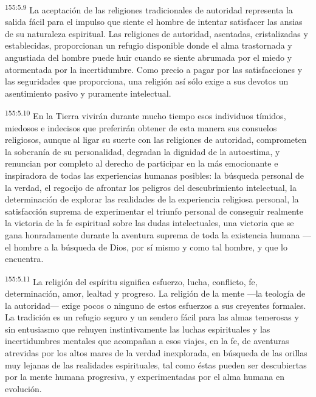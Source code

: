\par 
\textsuperscript{155:5.9} La aceptación de las religiones tradicionales de autoridad representa la salida fácil para el impulso que siente el hombre de intentar satisfacer las ansias de su naturaleza espiritual. Las religiones de autoridad, asentadas, cristalizadas y establecidas, proporcionan un refugio disponible donde el alma trastornada y angustiada del hombre puede huir cuando se siente abrumada por el miedo y atormentada por la incertidumbre. Como precio a pagar por las satisfacciones y las seguridades que proporciona, una religión así sólo exige a sus devotos un asentimiento pasivo y puramente intelectual.

\par 
\textsuperscript{155:5.10} En la Tierra vivirán durante mucho tiempo esos individuos tímidos, miedosos e indecisos que preferirán obtener de esta manera sus consuelos religiosos, aunque al ligar su suerte con las religiones de autoridad, comprometen la soberanía de su personalidad, degradan la dignidad de la autoestima, y renuncian por completo al derecho de participar en la más emocionante e inspiradora de todas las experiencias humanas posibles: la búsqueda personal de la verdad, el regocijo de afrontar los peligros del descubrimiento intelectual, la determinación de explorar las realidades de la experiencia religiosa personal, la satisfacción suprema de experimentar el triunfo personal de conseguir realmente la victoria de la fe espiritual sobre las dudas intelectuales, una victoria que se gana honradamente durante la aventura suprema de toda la existencia humana ---el hombre a la búsqueda de Dios, por sí mismo y como tal hombre, y que lo encuentra.

\par 
\textsuperscript{155:5.11} La religión del espíritu significa esfuerzo, lucha, conflicto, fe, determinación, amor, lealtad y progreso. La religión de la mente ---la teología de la autoridad--- exige pocos o ninguno de estos esfuerzos a sus creyentes formales. La tradición es un refugio seguro y un sendero fácil para las almas temerosas y sin entusiasmo que rehuyen instintivamente las luchas espirituales y las incertidumbres mentales que acompañan a esos viajes, en la fe, de aventuras atrevidas por los altos mares de la verdad inexplorada, en búsqueda de las orillas muy lejanas de las realidades espirituales, tal como éstas pueden ser descubiertas por la mente humana progresiva, y experimentadas por el alma humana en evolución.

